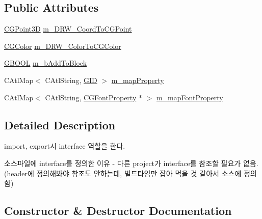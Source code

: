 \subsection*{Public Attributes}
\begin{DoxyCompactItemize}
\item 
\hyperlink{class_c_g_point3_d}{C\+G\+Point3\+D} \hyperlink{class_c_d_x_interface_a13b7d5d7733b89ca56d7e273da4c4acc}{m\+\_\+\+D\+R\+W\+\_\+\+Coord\+To\+C\+G\+Point}
\item 
\hyperlink{class_c_g_color}{C\+G\+Color} \hyperlink{class_c_d_x_interface_a3cbbd637a5bb2c086783093c114d0524}{m\+\_\+\+D\+R\+W\+\_\+\+Color\+To\+C\+G\+Color}
\item 
\hyperlink{_g_types_8h_a2901915743626352a6820c5405f556dc}{G\+B\+O\+O\+L} \hyperlink{class_c_d_x_interface_aaf5f60417b35af56325d29ee7a2e58d8}{m\+\_\+b\+Add\+To\+Block}
\item 
C\+Atl\+Map$<$ C\+Atl\+String, \hyperlink{_g_types_8h_a5b96ecb16d8e437977d12cd40aa6f6d8}{G\+I\+D} $>$ \hyperlink{class_c_d_x_interface_a38dea6333c2f7a9436c293eb61dca870}{m\+\_\+map\+Property}
\item 
C\+Atl\+Map$<$ C\+Atl\+String, \hyperlink{class_c_g_font_property}{C\+G\+Font\+Property} $\ast$ $>$ \hyperlink{class_c_d_x_interface_ae7eba4588b7a3d8264321425aec238ed}{m\+\_\+map\+Font\+Property}
\end{DoxyCompactItemize}


\subsection{Detailed Description}

\begin{DoxyItemize}
\item import, export시 interface 역할을 한다.
\item 소스파일에 interface를 정의한 이유 -\/ 다른 project가 interface를 참조할 필요가 없음.(header에 정의해봐야 참조도 안하는데, 빌드타임만 잡아 먹을 것 같아서 소스에 정의함) 
\end{DoxyItemize}

\subsection{Constructor \& Destructor Documentation}
\hypertarget{class_c_d_x_interface_ab8d0c36dee7b9de491f7ce5415057e72}{}
